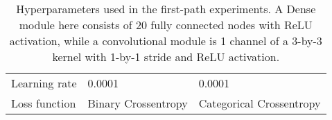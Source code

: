 \begin{table}[]
\begin{tabular}{lll}
Learning rate          & 0.0001                                                                                       & 0.0001                                                                                                                                                            \\
Loss function          & Binary Crossentropy                                                                          & Categorical Crossentropy                                                                                                                                         
\end{tabular}
\caption{Hyperparameters used in the first-path experiments. A Dense module here consists of 20 fully connected nodes with ReLU activation, while a convolutional module is 1 channel of a 3-by-3 kernel with 1-by-1 stride and ReLU activation.}
\label{tab:hyperparam}
\end{table}